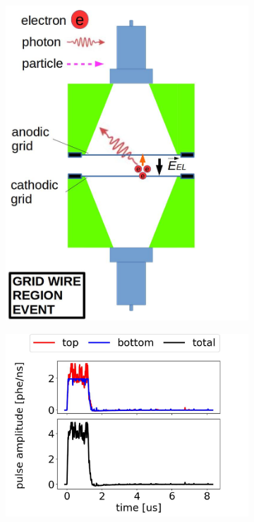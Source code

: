 \begin{figure}[!htbp]
	\centering
	\begin{subfigure}[b]{.8\textwidth}
		\centering
		\includegraphics[width=\halfwidth,clip,trim={0 0 0 0},angle=0,origin=c]{Figures/GasTest/WeiDrawEvent/WirePhoto.jpg}
		\caption{}
		\label{fig:}
	\end{subfigure}
	\par\bigskip
	\begin{subfigure}[b]{0.7\textwidth}
		\centering
		\includegraphics[width=\figurewidth,clip,trim={0 0 0 0}]{Figures/GasTest/exampleWaveforms/proc64767id00000117.jpg}%

\end{subfigure}
\end{figure}

